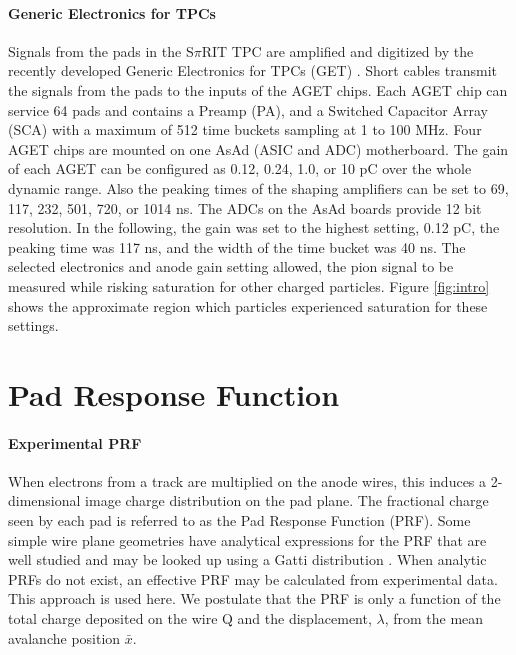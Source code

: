 \documentclass[review]{elsarticle}
\begin{document}
\paragraph{Generic Electronics for TPCs}
Signals from the pads in the S$\pi$RIT TPC are amplified and digitized by the recently developed Generic Electronics for TPCs (GET) \cite{get}.  Short cables transmit the signals from the pads to the inputs of the AGET chips. Each AGET chip can service 64 pads and contains a Preamp (PA), and a Switched Capacitor Array (SCA) with a maximum of 512 time buckets sampling at 1 to 100 MHz. Four AGET chips are mounted on one AsAd (ASIC and ADC) motherboard. The gain of each AGET can be configured as 0.12, 0.24, 1.0, or 10 pC over the whole dynamic range. Also the peaking times of the shaping amplifiers can be set to 69, 117, 232, 501, 720, or 1014 ns. The ADCs on the AsAd boards provide 12 bit resolution. In the following, the gain was set to the highest setting, 0.12 pC, the peaking time was 117 ns, and the width of the time bucket was  40 ns. The selected electronics and anode gain setting allowed, the pion signal to be measured while risking saturation for other charged particles. Figure \ref{fig:intro} shows the approximate region which particles experienced saturation for these settings.

\section{Pad Response Function}
\paragraph{Experimental PRF}
When electrons from a track are multiplied on the anode wires, this induces a 2-dimensional image charge distribution on the pad plane. The fractional charge seen by each pad is referred to as the Pad Response Function (PRF). Some simple wire plane geometries have analytical expressions for the PRF that are well studied and may be looked up using a Gatti distribution \cite{blumrol}. When analytic PRFs do not exist, an effective PRF may be calculated from experimental data.  This approach is used here. We postulate that the PRF is only a function of the total charge deposited on the wire Q and the displacement, $\lambda$, from the mean avalanche position $\bar{x}$.
\end{document}
